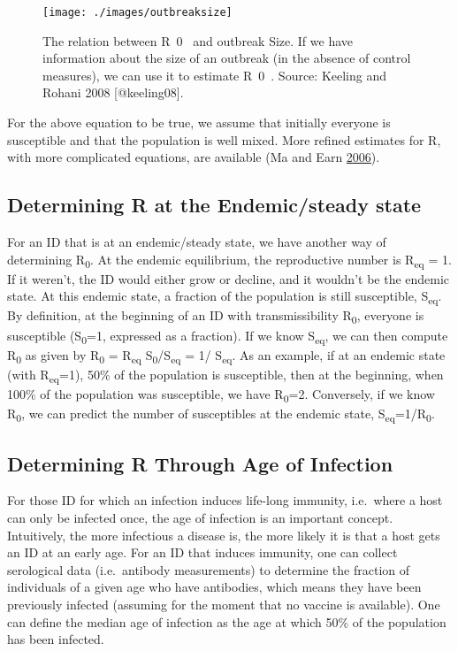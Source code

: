 \documentclass[
]{book}
\begin{document}
\begin{figure}
\texttt{[image: ./images/outbreaksize]} \caption{The relation between R~0~ and outbreak Size. If we have information about the size of an outbreak (in the absence of control measures), we can use it to estimate R~0~. Source: Keeling and Rohani 2008 [@keeling08].}\label{fig:outbreaksize}
\end{figure}

For the above equation to be true, we assume that initially everyone is susceptible and that the population is well mixed. More refined estimates for R, with more complicated equations, are available (Ma and Earn \protect\hyperlink{ref-ma06}{2006}).

\hypertarget{determining-r-at-the-endemicsteady-state}{%
\subsection{Determining R at the Endemic/steady state}\label{determining-r-at-the-endemicsteady-state}}

For an ID that is at an endemic/steady state, we have another way of determining R\textsubscript{0}. At the endemic equilibrium, the reproductive number is R\textsubscript{eq} = 1. If it weren't, the ID would either grow or decline, and it wouldn't be the endemic state. At this endemic state, a fraction of the population is still susceptible, S\textsubscript{eq}. By definition, at the beginning of an ID with transmissibility R\textsubscript{0}, everyone is susceptible (S\textsubscript{0}=1, expressed as a fraction). If we know S\textsubscript{eq}, we can then compute R\textsubscript{0} as given by R\textsubscript{0} = R\textsubscript{eq} S\textsubscript{0}/S\textsubscript{eq} = 1/ S\textsubscript{eq}. As an example, if at an endemic state (with R\textsubscript{eq}=1), 50\% of the population is susceptible, then at the beginning, when 100\% of the population was susceptible, we have R\textsubscript{0}=2. Conversely, if we know R\textsubscript{0}, we can predict the number of susceptibles at the endemic state, S\textsubscript{eq}=1/R\textsubscript{0}.

\hypertarget{determining-r-through-age-of-infection}{%
\subsection{Determining R Through Age of Infection}\label{determining-r-through-age-of-infection}}

For those ID for which an infection induces life-long immunity, i.e.~where a host can only be infected once, the age of infection is an important concept. Intuitively, the more infectious a disease is, the more likely it is that a host gets an ID at an early age. For an ID that induces immunity, one can collect serological data (i.e.~antibody measurements) to determine the fraction of individuals of a given age who have antibodies, which means they have been previously infected (assuming for the moment that no vaccine is available). One can define the median age of infection as the age at which 50\% of the population has been infected.
\end{document}
